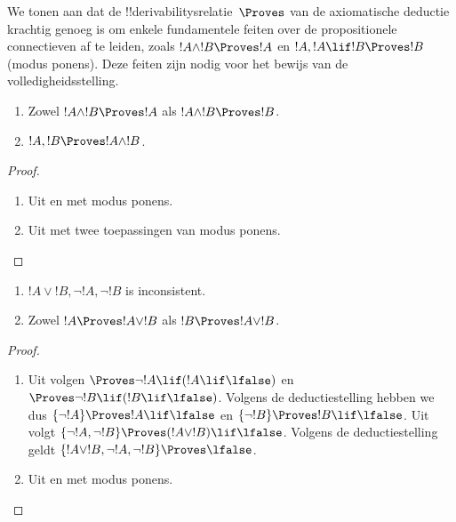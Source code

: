 \documentclass[openany]{memoir}
\begin{document}
\begin{explain}
  We tonen aan dat de !!{derivability}srelatie~$\Proves$ van de
  axiomatische deductie krachtig genoeg is om enkele fundamentele
  feiten over de propositionele connectieven af te leiden, zoals
  $!A \land !B \Proves !A$ en $!A, !A \lif !B \Proves !B$ (modus
  ponens). Deze feiten zijn nodig voor het bewijs van de
  volledigheidsstelling.
\end{explain}

\begin{prop}
  \begin{enumerate}
  \item {} Zowel $!A \land !B \Proves
    !A$ als $!A \land !B \Proves !B$.
  \item {} $!A, !B \Proves !A \land !B$.
  \end{enumerate}
\end{prop}

\begin{proof}
  \begin{enumerate}
    \item Uit  en  met
      modus ponens.
  \item Uit  met twee toepassingen van modus
    ponens.
  \end{enumerate}
\end{proof}


\begin{prop}
  \begin{enumerate}
  \item $!A \lor !B, \lnot !A, \lnot !B$ is inconsistent.
  \item Zowel $!A \Proves !A \lor !B$ als $!B \Proves !A \lor !B$.
  \end{enumerate}
\end{prop}

\begin{proof}
  \begin{enumerate}
  \item Uit  volgen $\Proves \lnot !A \lif (!A
    \lif \lfalse)$ en $\Proves \lnot !B \lif (!B \lif \lfalse)$.
    Volgens de deductiestelling hebben we dus $\{\lnot !A\} \Proves
    !A \lif \lfalse$ en $\{\lnot !B\} \Proves !B \lif \lfalse$. Uit
     volgt $\{\lnot !A, \lnot !B\} \Proves (!A
    \lor !B) \lif \lfalse$. Volgens de deductiestelling geldt
    $\{!A \lor !B, \lnot !A, \lnot !B\} \Proves \lfalse$.
  \item Uit  en  met modus
    ponens.
  \end{enumerate}
\end{proof}
\end{document}
